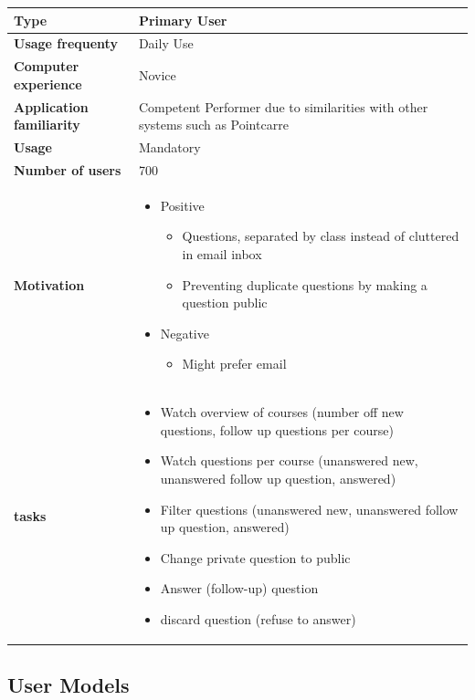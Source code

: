 \documentclass[10pt]{report}
\begin{document}
\begin{tabular}{ | l | p{10cm} |}
\hline
\textbf{Type} & Primary User \\ \hline
\textbf{Usage frequenty} & Daily Use \\ \hline
\textbf{Computer experience} & Novice \\ \hline
\textbf{Application familiarity} & Competent Performer due to similarities with other systems such as Pointcarre \\ \hline
\textbf{Usage} & Mandatory\\ \hline
\textbf{Number of users} & 700\\ \hline
\textbf{Motivation} & 
	\begin{itemize}
		\item Positive 
		\begin{itemize}
			\item Questions, separated by class instead of cluttered in email inbox
			\item Preventing duplicate questions by making a question public
		\end{itemize}
		\item Negative 
		\begin{itemize}
			\item Might prefer email
		\end{itemize}
	\end{itemize} \\ \hline
\textbf{tasks} & 
	\begin{itemize}
		\item Watch overview of courses (number off new questions, follow up questions per course)
		\item Watch questions per course (unanswered new, unanswered follow up question, answered)
		\item Filter questions (unanswered new, unanswered follow up question, answered)
		\item Change private question to public
		\item Answer (follow-up) question
		\item discard question (refuse to answer)
	\end{itemize} \\ \hline
\end{tabular}

\subsection{User Models}
\end{document}
